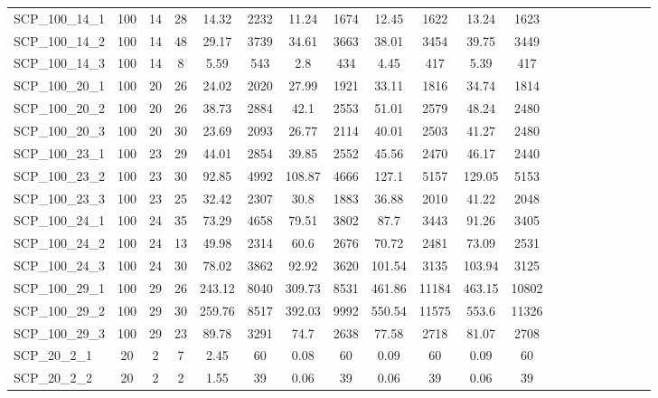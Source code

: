 \begin{sidewaystable}[!ht]
{\begin{tabular}{lccccccccccccccccccc}
SCP\_100\_14\_1 & 100 & 14 & 28 & 14.32 & 2232 &  \textcolor{blue2}{11.24} & 1674 & 12.45 & 1622 & 13.24 & 1623 \\
SCP\_100\_14\_2 & 100 & 14 & 48 &  \textcolor{blue2}{29.17} & 3739 & 34.61 & 3663 & 38.01 & 3454 & 39.75 & 3449 \\
SCP\_100\_14\_3 & 100 & 14 & 8 & 5.59 & 543 &  \textcolor{blue2}{2.8} & 434 & 4.45 & 417 & 5.39 & 417 \\
SCP\_100\_20\_1 & 100 & 20 & 26 &  \textcolor{blue2}{24.02} & 2020 & 27.99 & 1921 & 33.11 & 1816 & 34.74 & 1814 \\
SCP\_100\_20\_2 & 100 & 20 & 26 &  \textcolor{blue2}{38.73} & 2884 & 42.1 & 2553 & 51.01 & 2579 & 48.24 & 2480 \\
SCP\_100\_20\_3 & 100 & 20 & 30 &  \textcolor{blue2}{23.69} & 2093 & 26.77 & 2114 & 40.01 & 2503 & 41.27 & 2480 \\
SCP\_100\_23\_1 & 100 & 23 & 29 & 44.01 & 2854 &  \textcolor{blue2}{39.85} & 2552 & 45.56 & 2470 & 46.17 & 2440 \\
SCP\_100\_23\_2 & 100 & 23 & 30 &  \textcolor{blue2}{92.85} & 4992 & 108.87 & 4666 & 127.1 & 5157 & 129.05 & 5153 \\
SCP\_100\_23\_3 & 100 & 23 & 25 & 32.42 & 2307 &  \textcolor{blue2}{30.8} & 1883 & 36.88 & 2010 & 41.22 & 2048 \\
SCP\_100\_24\_1 & 100 & 24 & 35 &  \textcolor{blue2}{73.29} & 4658 & 79.51 & 3802 & 87.7 & 3443 & 91.26 & 3405 \\
SCP\_100\_24\_2 & 100 & 24 & 13 &  \textcolor{blue2}{49.98} & 2314 & 60.6 & 2676 & 70.72 & 2481 & 73.09 & 2531 \\
SCP\_100\_24\_3 & 100 & 24 & 30 &  \textcolor{blue2}{78.02} & 3862 & 92.92 & 3620 & 101.54 & 3135 & 103.94 & 3125 \\
SCP\_100\_29\_1 & 100 & 29 & 26 &  \textcolor{blue2}{243.12} & 8040 & 309.73 & 8531 & 461.86 & 11184 & 463.15 & 10802 \\
SCP\_100\_29\_2 & 100 & 29 & 30 &  \textcolor{blue2}{259.76} & 8517 & 392.03 & 9992 & 550.54 & 11575 & 553.6 & 11326 \\
SCP\_100\_29\_3 & 100 & 29 & 23 & 89.78 & 3291 & 74.7 & 2638 & 77.58 & 2718 & 81.07 & 2708 \\
SCP\_20\_2\_1 & 20 & 2 & 7 & 2.45 & 60 &  \textcolor{blue2}{0.08} & 60 & 0.09 & 60 & 0.09 & 60 \\
SCP\_20\_2\_2 & 20 & 2 & 2 & 1.55 & 39 &  \textcolor{blue2}{0.06} & 39 &  \textcolor{blue2}{0.06} & 39 &  \textcolor{blue2}{0.06} & 39 \\

\end{tabular}}
\end{sidewaystable}
